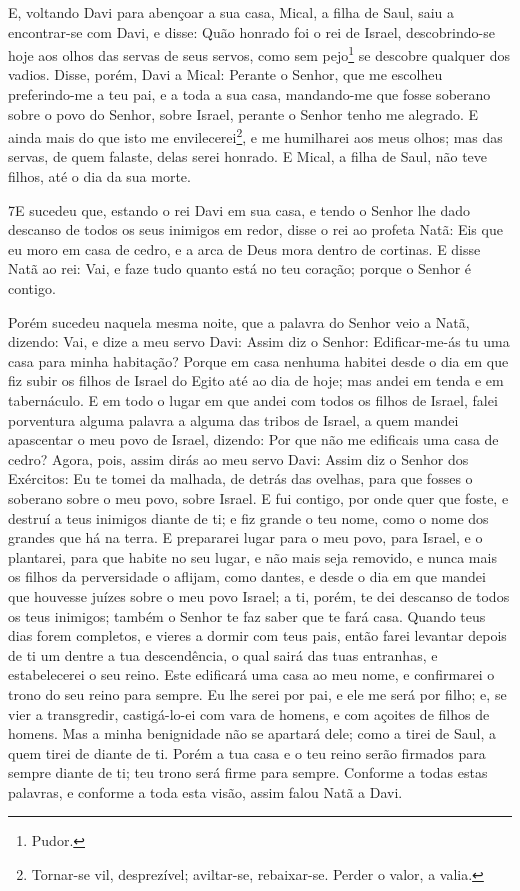 E, voltando Davi para abençoar a sua casa, Mical, a filha de
Saul, saiu a encontrar-se com Davi, e disse: Quão honrado foi o rei
de Israel, descobrindo-se hoje aos olhos das servas de seus servos,
como sem pejo\footnote{Pudor.} se descobre qualquer dos vadios.
Disse, porém, Davi a Mical: Perante o Senhor, que me escolheu
preferindo-me a teu pai, e a toda a sua casa, mandando-me que fosse
soberano sobre o povo do Senhor, sobre Israel, perante o Senhor
tenho me alegrado. E ainda mais do que isto me
envilecerei\footnote{Tornar-se vil, desprezível; aviltar-se,
rebaixar-se. Perder o valor, a valia.}, e me humilharei aos meus
olhos; mas das servas, de quem falaste, delas serei honrado.
E Mical, a filha de Saul, não teve filhos, até o dia da sua
morte.

\medskip

\lettrine{7} E sucedeu que, estando o rei Davi em sua casa, e
tendo o Senhor lhe dado descanso de todos os seus inimigos em redor,
disse o rei ao profeta Natã: Eis que eu moro em casa de cedro, e
a arca de Deus mora dentro de cortinas. E disse Natã ao rei:
Vai, e faze tudo quanto está no teu coração; porque o Senhor é
contigo.

Porém sucedeu naquela mesma noite, que a palavra do Senhor veio a
Natã, dizendo: Vai, e dize a meu servo Davi: Assim diz o Senhor:
Edificar-me-ás tu uma casa para minha habitação? Porque em casa
nenhuma habitei desde o dia em que fiz subir os filhos de Israel do
Egito até ao dia de hoje; mas andei em tenda e em tabernáculo. E
em todo o lugar em que andei com todos os filhos de Israel, falei
porventura alguma palavra a alguma das tribos de Israel, a quem
mandei apascentar o meu povo de Israel, dizendo: Por que não me
edificais uma casa de cedro? Agora, pois, assim dirás ao meu
servo Davi: Assim diz o Senhor dos Exércitos: Eu te tomei da
malhada, de detrás das ovelhas, para que fosses o soberano sobre o
meu povo, sobre Israel. E fui contigo, por onde quer que foste,
e destruí a teus inimigos diante de ti; e fiz grande o teu nome,
como o nome dos grandes que há na terra. E prepararei lugar
para o meu povo, para Israel, e o plantarei, para que habite no seu
lugar, e não mais seja removido, e nunca mais os filhos da
perversidade o aflijam, como dantes, e desde o dia em que
mandei que houvesse juízes sobre o meu povo Israel; a ti, porém, te
dei descanso de todos os teus inimigos; também o Senhor te faz saber
que te fará casa. Quando teus dias forem completos, e vieres
a dormir com teus pais, então farei levantar depois de ti um dentre
a tua descendência, o qual sairá das tuas entranhas, e estabelecerei
o seu reino. Este edificará uma casa ao meu nome, e
confirmarei o trono do seu reino para sempre. Eu lhe serei
por pai, e ele me será por filho; e, se vier a transgredir,
castigá-lo-ei com vara de homens, e com açoites de filhos de homens.
Mas a minha benignidade não se apartará dele; como a tirei de
Saul, a quem tirei de diante de ti. Porém a tua casa e o teu
reino serão firmados para sempre diante de ti; teu trono será firme
para sempre. Conforme a todas estas palavras, e conforme a
toda esta visão, assim falou Natã a Davi.

